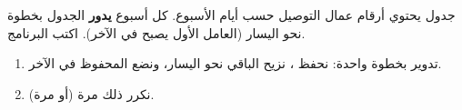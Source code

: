 \begin{statement}
جدول يحتوي أرقام عمال التوصيل حسب أيام الأسبوع. كل أسبوع \textbf{يدور} الجدول بخطوة  نحو اليسار (العامل الأول يصبح في الآخر). اكتب البرنامج.
\end{statement}
\begin{stepsbox}\begin{enumerate}
\item تدوير بخطوة واحدة: نحفظ ، نزيح الباقي نحو اليسار، ونضع المحفوظ في الآخر.
\item نكرر ذلك  مرة (أو  مرة).
\end{enumerate}\end{stepsbox}
